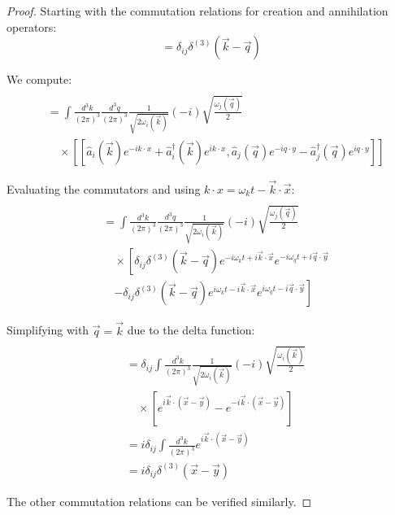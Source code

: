\documentclass[12pt,a4paper]{article}
\begin{document}
\begin{proof}
Starting with the commutation relations for creation and annihilation operators:
\begin{equation}
[\hat{a}_i(\vec{k}), \hat{a}_j^{\dagger}(\vec{q})] = \delta_{ij} \delta^{(3)}(\vec{k} - \vec{q})
\end{equation}

We compute:
\begin{align}
[\hat{\phi}_i&(t, \vec{x}), \hat{\pi}_j(t, \vec{y})] \\
&= \int \frac{d^3k}{(2\pi)^3} \frac{d^3q}{(2\pi)^3} \frac{1}{\sqrt{2\omega_i(\vec{k})}} (-i) \sqrt{\frac{\omega_j(\vec{q})}{2}} \\
&\quad \times \left[\left[\hat{a}_i(\vec{k})e^{-ik \cdot x} + \hat{a}_i^{\dagger}(\vec{k})e^{ik \cdot x}, \hat{a}_j(\vec{q})e^{-iq \cdot y} - \hat{a}_j^{\dagger}(\vec{q})e^{iq \cdot y}\right]\right]
\end{align}

Evaluating the commutators and using $k \cdot x = \omega_k t - \vec{k} \cdot \vec{x}$:
\begin{align}
[\hat{\phi}_i&(t, \vec{x}), \hat{\pi}_j(t, \vec{y})] \\
&= \int \frac{d^3k}{(2\pi)^3} \frac{d^3q}{(2\pi)^3} \frac{1}{\sqrt{2\omega_i(\vec{k})}} (-i) \sqrt{\frac{\omega_j(\vec{q})}{2}} \\
&\quad \times \left[\delta_{ij}\delta^{(3)}(\vec{k} - \vec{q})e^{-i\omega_k t + i\vec{k} \cdot \vec{x}}e^{-i\omega_q t + i\vec{q} \cdot \vec{y}} \right. \\
&\quad \left. - \delta_{ij}\delta^{(3)}(\vec{k} - \vec{q})e^{i\omega_k t - i\vec{k} \cdot \vec{x}}e^{i\omega_q t - i\vec{q} \cdot \vec{y}}\right]
\end{align}

Simplifying with $\vec{q} = \vec{k}$ due to the delta function:
\begin{align}
[\hat{\phi}_i&(t, \vec{x}), \hat{\pi}_j(t, \vec{y})] \\
&= \delta_{ij} \int \frac{d^3k}{(2\pi)^3} \frac{1}{\sqrt{2\omega_i(\vec{k})}} (-i) \sqrt{\frac{\omega_i(\vec{k})}{2}} \\
&\quad \times \left[e^{i\vec{k} \cdot (\vec{x} - \vec{y})} - e^{-i\vec{k} \cdot (\vec{x} - \vec{y})}\right] \\
&= i\delta_{ij} \int \frac{d^3k}{(2\pi)^3} e^{i\vec{k} \cdot (\vec{x} - \vec{y})} \\
&= i\delta_{ij}\delta^{(3)}(\vec{x} - \vec{y})
\end{align}

The other commutation relations can be verified similarly.
\end{proof}
\end{document}
